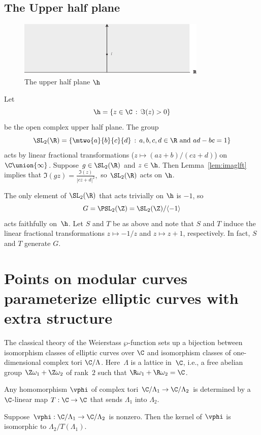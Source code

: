 \documentclass{report}
\begin{document}
\subsection{The Upper half plane}
\begin{figure}
\begin{center}
\includegraphics[width=0.80\textwidth]{graphics/uhp}
\caption{The upper half plane $\h$}
\end{center}
\end{figure}
Let
\[
  \h = \{z\in\C \,:\, \Im(z) > 0\}
\]
be the open complex upper half plane. The group
\[
\SL_2(\R) = \left\{ \mtwo{a}{b}{c}{d} \,:\, a,b,c,d\in\R \text{
and } ad-bc = 1\right\}
\]
acts by linear fractional transformations ($z\mapsto
(az+b)/(cz+d)$) on $\C\union\{\infty\}$.
Suppose $g\in\SL_2(\R)$ and $z\in\h$.  Then Lemma~\ref{lem:imaglft}
implies that
$
  \Im(gz) = \frac{\Im(z)}{|cz+d|^2},
$
so $\SL_2(\R)$ acts on $\h$.

The only element of $\SL_2(\R)$ that acts trivially on $\h$ is
$-1$, so $$G = \PSL_2(\Z) = \SL_2(\Z)/\langle -1 \rangle$$ acts
faithfully on~$\h$.  Let $S$ and $T$ be as above and note that $S$
and $T$ induce the linear fractional transformations $z\mapsto
-1/z$ and $z\mapsto z+1$, respectively.  In fact, $S$
and $T$ generate $G$.

\section{Points on modular curves parameterize elliptic curves with extra structure}\label{sec:modcurveparam}
The classical theory of the Weierstass $\wp$-function sets up a
bijection between isomorphism classes of elliptic curves over $\C$
and isomorphism classes of one-dimensional complex tori
$\C/\Lambda$.  Here~$\Lambda$ is a lattice in~$\C$, i.e., a free
abelian group $\Z\omega_1+\Z\omega_2$ of rank~$2$ such that
$\R\omega_1+\R\omega_2=\C$.

Any homomorphism $\vphi$ of complex tori $\C/\Lambda_1\to
\C/\Lambda_2$ is determined by a $\C$-linear map $T:\C\to \C$ that
sends $\Lambda_1$ into $\Lambda_2$.
\begin{lemma}\label{lem:ellcurvemapker} Suppose $\vphi:\C/\Lambda_1\to
\C/\Lambda_2$ is nonzero.  Then the kernel of $\vphi$ is
isomorphic to $\Lambda_2/T(\Lambda_1)$.
\end{lemma}
\end{document}

